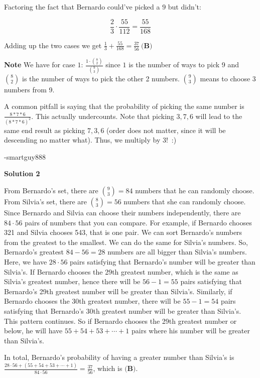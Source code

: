 \begin{enumerate}
 Factoring the fact that Bernardo could've picked a $9$ but didn't:

 
 \[\frac{2}{3}\cdot{\frac{55}{112}} = \frac{55}{168}\]

 Adding up the two cases we get $\frac{1}{3}+\frac{55}{168} = \boxed{\frac{37}{56}\ \textbf{(B)}}$

 \textbf{Note} We have for case $1$: $\frac{1 \cdot \binom{8}{2}}{\binom{9}{3}}$ since $1$ is the number of ways to pick 9 and $\binom{8}{2}$ is the number of ways to pick the other 2 numbers. $\binom{9}{3}$ means to choose 3 numbers from 9.

 A common pitfall is saying that the probability of picking the same number is $\frac{8*7*6}{(8*7*6)^2}$. This actually undercounts. Note that picking $3,7,6$ will lead to the same end result as picking $7,3,6$ (order does not matter, since it will be descending no matter what). Thus, we multiply by $3!$ :)

 -smartguy888

 



\textbf{Solution 2}

From Bernardo's set, there are $\binom{9}{3} = 84$ numbers that he can randomly choose. From Silvia's set, there are $\binom{8}{3} = 56$ numbers that she can randomly choose. Since Bernardo and Silvia can choose their numbers independently, there are $84 \cdot 56$ pairs of numbers that you can compare. For example, if Bernardo chooses 321 and Silvia chooses 543, that is one pair. We can sort Bernardo's numbers from the greatest to the smallest. We can do the same for Silvia's numbers. So, Bernardo's greatest $84 - 56 = 28$ numbers are all bigger than Silvia's numbers. Here, we have $28 \cdot 56$ pairs satisfying that Bernardo's number will be greater than Silvia's. If Bernardo chooses the 29th greatest number, which is the same as Silvia's greatest number, hence there will be $56 - 1 = 55$ pairs satisfying that Bernardo's 29th greatest number will be greater than Silvia's. Similarly, if Bernardo chooses the 30th greatest number, there will be $55 - 1 = 54$ pairs satisfying that Bernardo's 30th greatest number will be greater than Silvia's. This pattern continues. So if Bernardo chooses the 29th greatest number or below, he will have $55 + 54 + 53 + \cdots + 1$ pairs where his number will be greater than Silvia's. 

 In total, Bernardo's probability of having a greater number than Silvia's is $\frac{28 \cdot 56 + (55 + 54 + 53 + \cdots + 1)}{84 \cdot 56} = \frac{37}{56}$, which is $\textbf{(B)}$.


\end{enumerate}
